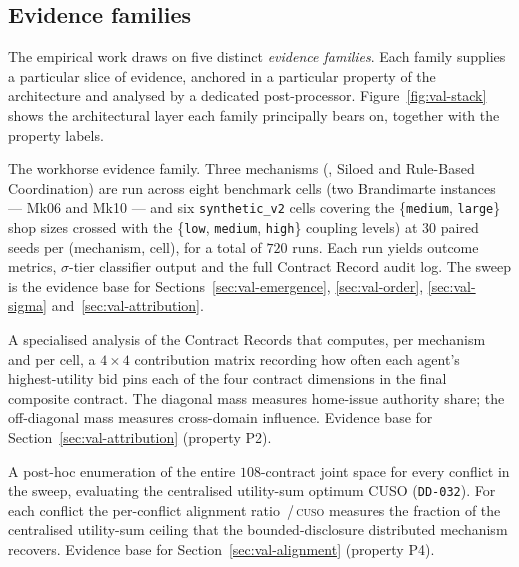 \subsection{Evidence families}
\label{subsec:val-evidence}

The empirical work draws on five distinct \emph{evidence families}.
Each family supplies a particular slice of evidence, anchored in a
particular property of the architecture and analysed by a dedicated
post-processor. Figure~\ref{fig:val-stack} shows the architectural
layer each family principally bears on, together with the property
labels.

\begin{description}[leftmargin=2.4em,style=nextline,itemsep=0.25em]
  \item[Main coordination sweep.] The workhorse evidence family. Three
    mechanisms (\NEXUS{}, Siloed and Rule-Based Coordination) are run
    across eight benchmark cells (two Brandimarte instances --- Mk06
    and Mk10 --- and six \texttt{synthetic\_v2} cells covering the
    \{\texttt{medium}, \texttt{large}\} shop sizes crossed with the
    \{\texttt{low}, \texttt{medium}, \texttt{high}\} coupling levels)
    at $30$ paired seeds per (mechanism, cell), for a total of $720$
    runs. Each run yields outcome metrics, $\sigma$-tier classifier
    output and the full Contract Record audit log. The sweep is the
    evidence base for Sections~\ref{sec:val-emergence},
    \ref{sec:val-order}, \ref{sec:val-sigma} and~\ref{sec:val-attribution}.
  \item[Decision attribution analysis.] A specialised analysis of the
    Contract Records that computes, per mechanism and per cell, a
    $4\times 4$ contribution matrix recording how often each agent's
    highest-utility bid pins each of the four contract dimensions in
    the final composite contract. The diagonal mass measures
    home-issue authority share; the off-diagonal mass measures
    cross-domain influence. Evidence base for
    Section~\ref{sec:val-attribution} (property P2).
  \item[Centralised alignment benchmark.] A post-hoc enumeration of
    the entire $108$-contract joint space for every conflict in the
    sweep, evaluating the centralised utility-sum optimum CUSO
    (\texttt{DD-032}). For each conflict the per-conflict alignment
    ratio \NEXUS{}\,/\,\textsc{cuso} measures the fraction of the
    centralised utility-sum ceiling that the bounded-disclosure
    distributed mechanism recovers. Evidence base for
    Section~\ref{sec:val-alignment} (property P4).

\end{description}
